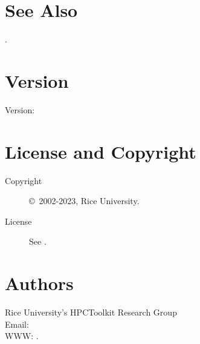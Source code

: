 \documentclass[english]{article}
\begin{document}

\section{See Also}

.

\section{Version}

Version: \Version

\section{License and Copyright}

\begin{description}
\item[Copyright] \copyright\ 2002-2023, Rice University.
\item[License] See .
\end{description}

\section{Authors}

\noindent
Rice University's HPCToolkit Research Group \\
Email:  \\
WWW: .

\LatexManEnd
\end{document}
